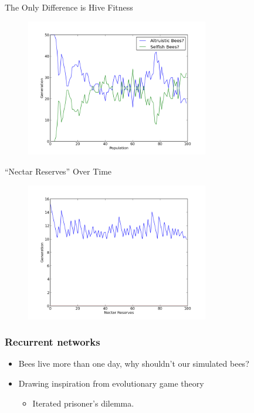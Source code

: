 \documentclass{beamer}
\begin{document}
    \begin{frame}{The Only Difference is Hive Fitness}
        \begin{figure}
        \includegraphics[width=8cm]{hive_influenced_bees.png}
        \end{figure}
    \end{frame}

    \begin{frame}{``Nectar Reserves'' Over Time}
        \begin{figure}
        \includegraphics[width=8cm]{hive_influenced_bees_nectar.png}
        \end{figure}
    \end{frame}

    \begin{frame}[t]\frametitle{Recurrent networks}
        
        \begin{itemize}
            \item Bees live more than one day, why shouldn't our simulated bees?
            \item Drawing inspiration from evolutionary game theory
            \begin{itemize}
                \item Iterated prisoner's dilemma.
            \end{itemize}
        \end{itemize}
    
    \end{frame}
\end{document}

